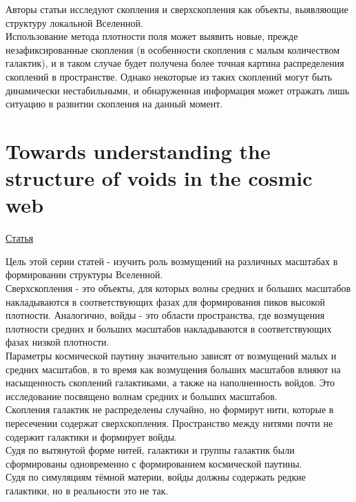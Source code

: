 \documentclass{article}
\begin{document}
Авторы статьи исследуют скопления и сверхскопления как объекты, выявляющие структуру локальной 
Вселенной.\\

Использование метода плотности поля может выявить новые, прежде незафиксированные скопления (в 
особенности скопления с малым количеством галактик), и в таком случае будет получена более точная 
картина распределения скоплений в пространстве. Однако некоторые из таких скоплений могут быть 
динамически нестабильными, и обнаруженная информация может отражать лишь ситуацию в развитии 
скопления на данный момент.\\

\section{Towards understanding the structure of voids in the cosmic web}
\hyperlink{https://www.aanda.org/articles/aa/pdf/2011/10/aa17248-11.pdf}{Статья}

Цель этой серии статей - изучить роль возмущений на различных масштабах в формировании структуры 
Вселенной.\\

Сверхскопления - это объекты, для которых волны средних и больших масштабов накладываются в 
соответствующих фазах для формирования пиков высокой плотности. Аналогично, войды - это области 
пространства, где возмущения плотности средних и больших масштабов накладываются в соответствующих 
фазах низкой плотности.\\

Параметры космической паутину значительно зависят от возмущений малых и средних масштабов, в то время 
как возмущения больших масштабов влияют на насыщенность скоплений галактиками, а также на наполненность
войдов. Это исследование посвящено волнам средних и больших масштабов.\\

Скопления галактик не распределены случайно, но формирут нити, которые в пересечении содержат 
сверхскопления. Пространство между нитями почти не содержит галактики и формирует войды.\\

Судя по вытянутой форме нитей, галактики и группы галактик были сформированы одновременно с 
формированием космической паутины.\\

Судя по симуляциям тёмной материи, войды должны содержать редкие галактики, но в реальности это не 
так.\\
\end{document}
